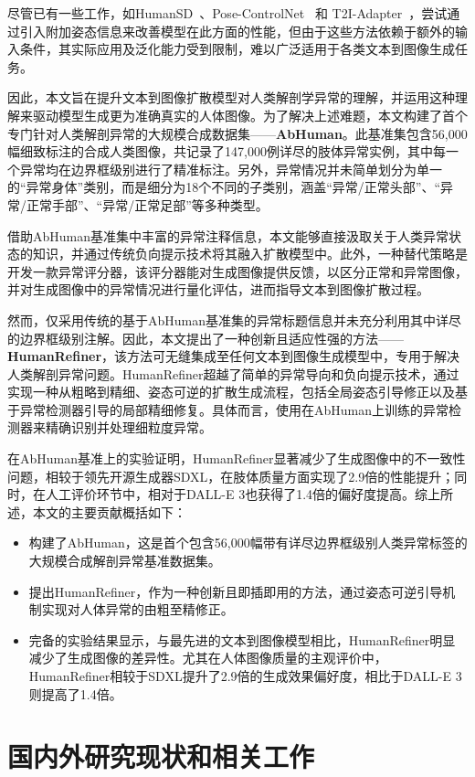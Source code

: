 尽管已有一些工作，如HumanSD~\cite{ju2023humansd}、Pose-ControlNet~\cite{controlnet} 和 T2I-Adapter~\cite{t2i_adapter}，尝试通过引入附加姿态信息来改善模型在此方面的性能，但由于这些方法依赖于额外的输入条件，其实际应用及泛化能力受到限制，难以广泛适用于各类文本到图像生成任务。

因此，本文旨在提升文本到图像扩散模型对人类解剖学异常的理解，并运用这种理解来驱动模型生成更为准确真实的人体图像。为了解决上述难题，本文构建了首个专门针对人类解剖异常的大规模合成数据集——\textbf{AbHuman}。此基准集包含56,000幅细致标注的合成人类图像，共记录了147,000例详尽的肢体异常实例，其中每一个异常均在边界框级别进行了精准标注。另外，异常情况并未简单划分为单一的“异常身体”类别，而是细分为18个不同的子类别，涵盖“异常/正常头部”、“异常/正常手部”、“异常/正常足部”等多种类型。

借助AbHuman基准集中丰富的异常注释信息，本文能够直接汲取关于人类异常状态的知识，并通过传统负向提示技术将其融入扩散模型中。此外，一种替代策略是开发一款异常评分器，该评分器能对生成图像提供反馈，以区分正常和异常图像，并对生成图像中的异常情况进行量化评估，进而指导文本到图像扩散过程。

然而，仅采用传统的基于AbHuman基准集的异常标题信息并未充分利用其中详尽的边界框级别注解。因此，本文提出了一种创新且适应性强的方法——\textbf{HumanRefiner}，该方法可无缝集成至任何文本到图像生成模型中，专用于解决人类解剖异常问题。HumanRefiner超越了简单的异常导向和负向提示技术，通过实现一种从粗略到精细、姿态可逆的扩散生成流程，包括全局姿态引导修正以及基于异常检测器引导的局部精细修复。具体而言，使用在AbHuman上训练的异常检测器来精确识别并处理细粒度异常。

在AbHuman基准上的实验证明，HumanRefiner显著减少了生成图像中的不一致性问题，相较于领先开源生成器SDXL，在肢体质量方面实现了2.9倍的性能提升；同时，在人工评价环节中，相对于DALL-E 3也获得了1.4倍的偏好度提高。综上所述，本文的主要贡献概括如下：
\begin{itemize}
\item 构建了AbHuman，这是首个包含56,000幅带有详尽边界框级别人类异常标签的大规模合成解剖异常基准数据集。
\item 提出HumanRefiner，作为一种创新且即插即用的方法，通过姿态可逆引导机制实现对人体异常的由粗至精修正。
\item 完备的实验结果显示，与最先进的文本到图像模型相比，HumanRefiner明显减少了生成图像的差异性。尤其在人体图像质量的主观评价中，HumanRefiner相较于SDXL提升了2.9倍的生成效果偏好度，相比于DALL-E 3则提高了1.4倍。
\end{itemize}

\section{国内外研究现状和相关工作}
\label{sec:related_work}
